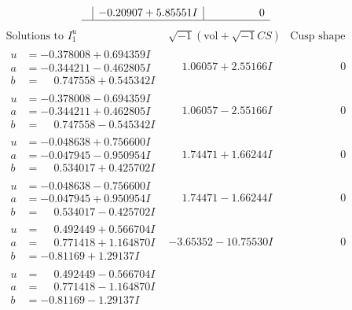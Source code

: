 \documentclass[1p]{elsarticle_modified}
\theoremstyle{definition}
\newcommand{\I}{\sqrt{-1}}
\begin{document}
$$\begin{array}{c|c|c}
 & -0.20907 + 5.85551 I & \phantom{-0.000000 } 0\\
 \hline 
 \end{array}$$\newpage$$\begin{array}{c|c|c}  
\text{Solutions to }I^u_{1}& \I (\text{vol} + \sqrt{-1}CS) & \text{Cusp shape}\\
 \hline 
\begin{aligned}
u &= -0.378008 + 0.694359 I \\
a &= -0.344211 - 0.462805 I \\
b &= \phantom{-}0.747558 + 0.545342 I\end{aligned}
 & \phantom{-}1.06057 + 2.55166 I & \phantom{-0.000000 } 0 \\ \hline\begin{aligned}
u &= -0.378008 - 0.694359 I \\
a &= -0.344211 + 0.462805 I \\
b &= \phantom{-}0.747558 - 0.545342 I\end{aligned}
 & \phantom{-}1.06057 - 2.55166 I & \phantom{-0.000000 } 0 \\ \hline\begin{aligned}
u &= -0.048638 + 0.756600 I \\
a &= -0.047945 - 0.950954 I \\
b &= \phantom{-}0.534017 + 0.425702 I\end{aligned}
 & \phantom{-}1.74471 + 1.66244 I & \phantom{-0.000000 } 0 \\ \hline\begin{aligned}
u &= -0.048638 - 0.756600 I \\
a &= -0.047945 + 0.950954 I \\
b &= \phantom{-}0.534017 - 0.425702 I\end{aligned}
 & \phantom{-}1.74471 - 1.66244 I & \phantom{-0.000000 } 0 \\ \hline\begin{aligned}
u &= \phantom{-}0.492449 + 0.566704 I \\
a &= \phantom{-}0.771418 + 1.164870 I \\
b &= -0.81169 + 1.29137 I\end{aligned}
 & -3.65352 - 10.75530 I & \phantom{-0.000000 } 0 \\ \hline\begin{aligned}
u &= \phantom{-}0.492449 - 0.566704 I \\
a &= \phantom{-}0.771418 - 1.164870 I \\
b &= -0.81169 - 1.29137 I\end{aligned}

\end{array}$$
\end{document}
